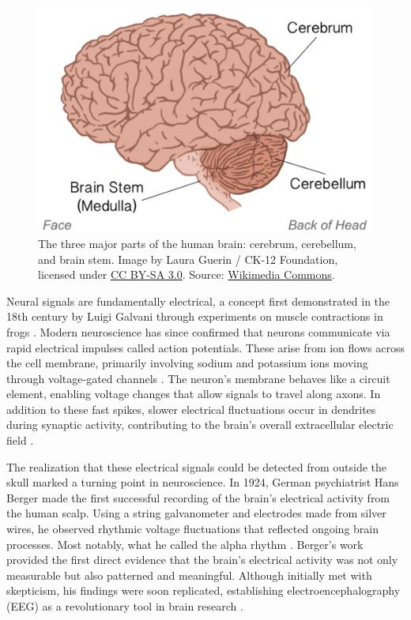\documentclass[final, a4paper,masters,en,listoffigures,listoftables,norwegiandates]{NMBU}
\begin{document}
\begin{figure}[h]
    \centering
    \includegraphics[width=0.5\linewidth]{Figures/3_major_parts_of_the_brain.png}
    \caption{The three major parts of the human brain: cerebrum, cerebellum, and brain stem. Image by Laura Guerin / CK-12 Foundation, licensed under \href{https://creativecommons.org/licenses/by-sa/3.0/}{CC BY-SA 3.0}. Source: \href{https://commons.wikimedia.org/wiki/File:3_major_parts_of_the_brain.png}{Wikimedia Commons}.}
    \label{fig:Brainparts}
\end{figure}

Neural signals are fundamentally electrical, a concept first demonstrated in the 18th century by Luigi Galvani through experiments on muscle contractions in frogs \cite{PICCOLINO1998AnimalElectricity}. Modern neuroscience has since confirmed that neurons communicate via rapid electrical impulses called action potentials. These arise from ion flows across the cell membrane, primarily involving sodium and potassium ions moving through voltage-gated channels \cite{hodgkin1952quantitative}. The neuron's membrane behaves like a circuit element, enabling voltage changes that allow signals to travel along axons. In addition to these fast spikes, slower electrical fluctuations occur in dendrites during synaptic activity, contributing to the brain's overall extracellular electric field \cite{Halnes2024ElectricBrainSignals}.

The realization that these electrical signals could be detected from outside the skull marked a turning point in neuroscience. In 1924, German psychiatrist Hans Berger made the first successful recording of the brain’s electrical activity from the human scalp. Using a string galvanometer and electrodes made from silver wires, he observed rhythmic voltage fluctuations that reflected ongoing brain processes. Most notably, what he called the alpha rhythm \cite{berger1929elektroenkephalogramm}. Berger’s work provided the first direct evidence that the brain’s electrical activity was not only measurable but also patterned and meaningful. Although initially met with skepticism, his findings were soon replicated, establishing electroencephalography (EEG) as a revolutionary tool in brain research \cite{Halnes2024ElectricBrainSignals, finger1994origins, kandel2021principles}. 
\end{document}
